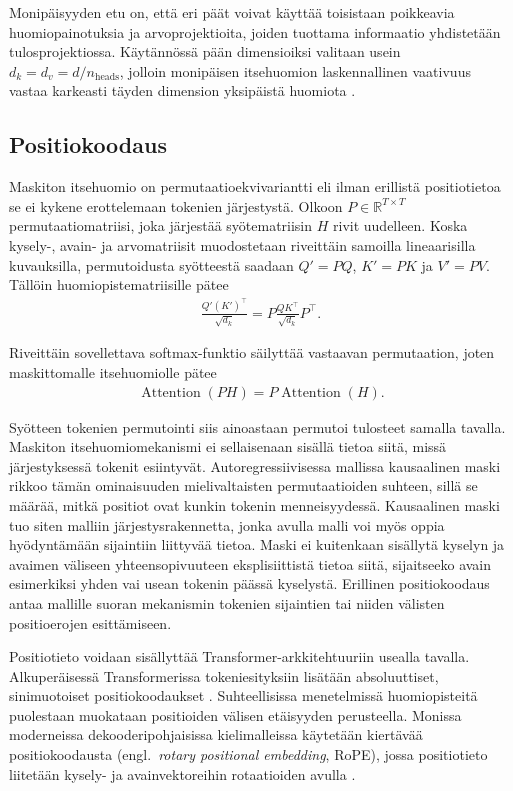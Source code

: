 Monipäisyyden etu on, että eri päät
voivat käyttää toisistaan poikkeavia huomiopainotuksia ja
arvoprojektioita, joiden tuottama informaatio yhdistetään
tulosprojektiossa. Käytännössä pään dimensioiksi valitaan
usein \(d_k = d_v = d/n_\text{heads}\), jolloin monipäisen itsehuomion
laskennallinen vaativuus vastaa karkeasti täyden dimension
yksipäistä huomiota \cite{vaswani2017attention}.

\subsection{Positiokoodaus}

Maskiton itsehuomio on permutaatioekvivariantti eli ilman erillistä
positiotietoa se ei kykene erottelemaan tokenien järjestystä. Olkoon
\(P \in \mathbb{R}^{T \times T}\) permutaatiomatriisi, joka järjestää
syötematriisin \(H\) rivit uudelleen. Koska kysely-, avain- ja
arvomatriisit muodostetaan riveittäin samoilla lineaarisilla
kuvauksilla, permutoidusta syötteestä saadaan
\(Q' = PQ\), \(K' = PK\) ja \(V' = PV\). Tällöin
huomiopistematriisille pätee
\begin{align*}
  \frac{Q'(K')^{\top}}{\sqrt{d_k}}
  =
  P
  \frac{QK^{\top}}{\sqrt{d_k}}
  P^{\top}.
\end{align*}

Riveittäin sovellettava softmax-funktio säilyttää vastaavan
permutaation, joten maskittomalle itsehuomiolle pätee
\begin{align*}
  \operatorname{Attention}(PH)
  =
  P\operatorname{Attention}(H).
\end{align*}

Syötteen tokenien permutointi siis ainoastaan permutoi tulosteet
samalla tavalla. Maskiton itsehuomiomekanismi ei sellaisenaan sisällä
tietoa siitä, missä järjestyksessä tokenit esiintyvät.
Autoregressiivisessa mallissa kausaalinen maski rikkoo tämän
ominaisuuden mielivaltaisten permutaatioiden suhteen, sillä se määrää,
mitkä positiot ovat kunkin tokenin menneisyydessä. Kausaalinen maski
tuo siten malliin järjestysrakennetta, jonka avulla malli voi myös
oppia hyödyntämään sijaintiin liittyvää tietoa. Maski ei kuitenkaan
sisällytä kyselyn ja avaimen väliseen yhteensopivuuteen eksplisiittistä
tietoa siitä, sijaitseeko avain esimerkiksi yhden vai usean tokenin
päässä kyselystä. Erillinen positiokoodaus antaa mallille suoran
mekanismin tokenien sijaintien tai niiden välisten positioerojen
esittämiseen.

Positiotieto voidaan sisällyttää Transformer-arkkitehtuuriin usealla
tavalla. Alkuperäisessä Transformerissa tokeniesityksiin lisätään
absoluuttiset, sinimuotoiset positiokoodaukset
\cite{vaswani2017attention}. Suhteellisissa menetelmissä
huomiopisteitä puolestaan muokataan positioiden välisen etäisyyden
perusteella. Monissa moderneissa dekooderipohjaisissa kielimalleissa
käytetään kiertävää positiokoodausta (engl.\ \emph{rotary positional
embedding}, RoPE), jossa positiotieto liitetään kysely- ja
avainvektoreihin rotaatioiden avulla \cite{su2024roformer}.

